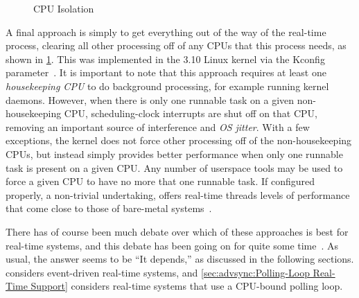 \begin{figure}
\centering
{}
\caption{CPU Isolation}
\label{fig:advsync:CPU Isolation}
\end{figure}

A final approach is simply to get everything out of the way of the
real-time process, clearing all other processing off of any CPUs that
this process needs, as shown in \cref{fig:advsync:CPU Isolation}.
This was implemented in the 3.10 Linux kernel via the 
Kconfig parameter~\cite{JonCorbet2013NO-HZ-FULL,FredericWeisbecker2013nohz}.
It is important to note that this approach requires at least one
\emph{housekeeping CPU} to do background processing, for example running
kernel daemons.
However, when there is only one runnable task on a given non-housekeeping CPU,
scheduling-clock interrupts are shut off on that CPU, removing an important
source of interference and \emph{OS jitter}.
With a few exceptions, the kernel does not force other processing off of the
non-housekeeping CPUs, but instead simply provides better performance
when only one runnable task is present on a given CPU\@.
Any number of userspace tools may be used to force a given CPU to have
no more that one runnable task.
If configured properly, a non-trivial undertaking, 
offers real-time threads levels of performance that come close to those of
bare-metal systems~\cite{AbdullahAljuhni2018nohzfull}.

There has of course been much debate over which of these approaches
is best for real-time systems, and this debate has been going on for
quite some
time~\cite{JonCorbet2004RealTimeLinuxPart1,JonCorbet2004RealTimeLinuxPart2}.
As usual, the answer seems to be ``It depends,'' as discussed in the
following sections.
considers event-driven real-time systems, and
\cref{sec:advsync:Polling-Loop Real-Time Support}
considers real-time systems that use a CPU-bound polling loop.


